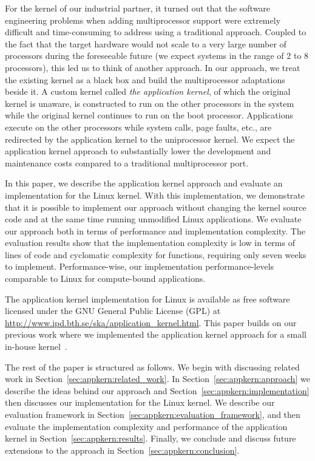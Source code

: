 For the kernel of our industrial partner, it turned out that the software
engineering problems when adding multiprocessor support were extremely difficult
and time-consuming to address using a traditional approach. Coupled to the
fact that the target hardware would not scale to a very large number of
processors during the foreseeable future (we expect systems in the range of 2
to 8 processors), this led us to think of another approach. In our approach,
we treat the existing kernel as a black box and build the multiprocessor
adaptations beside it. A custom kernel called \emph{the application kernel},
of which the original kernel is unaware, is constructed to run on the other
processors in the system while the original kernel continues to run on the
boot processor. Applications execute on the other processors while system
calls, page faults, etc., are redirected by the application kernel to the
uniprocessor kernel. We expect the application kernel approach to
substantially lower the development and maintenance costs compared to a
traditional multiprocessor port.

In this paper, we describe the application kernel approach and evaluate an
implementation for the Linux kernel. With this implementation, we demonstrate
that it is possible to implement our approach without changing the kernel
source code and at the same time running unmodified Linux applications. We
evaluate our approach both in terms of performance and implementation
complexity. The evaluation results show that the implementation complexity is
low in terms of lines of code and cyclomatic complexity for functions,
requiring only seven weeks to implement. Performance-wise, our implementation
performance-levels comparable to Linux for compute-bound applications.

The application kernel implementation for Linux is available as free software
licensed under the GNU General Public License (GPL) at
\url{http://www.ipd.bth.se/ska/application_kernel.html}. This paper builds on
our previous work where we implemented the application kernel approach for a
small in-house kernel~\cite{ska2004}.

The rest of the paper is structured as follows. We begin with discussing
related work in Section~\ref{sec:appkern:related_work}. In Section~\ref{sec:appkern:approach}
we describe the ideas behind our approach and Section~\ref{sec:appkern:implementation}
then discusses our implementation for the Linux kernel. We describe our
evaluation framework in Section~\ref{sec:appkern:evaluation_framework}, and then
evaluate the implementation complexity and performance of the application
kernel in Section~\ref{sec:appkern:results}.  Finally, we conclude and discuss future
extensions to the approach in Section~\ref{sec:appkern:conclusion}.


